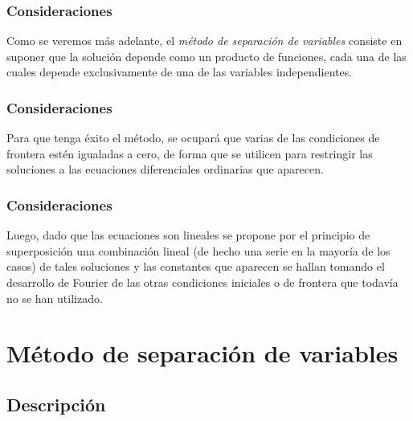 \documentclass[12pt]{beamer}
\begin{document}
\begin{frame}
\frametitle{Consideraciones}
Como se veremos más adelante, el \emph{método de separación de variables} consiste en suponer que la solución depende como un producto de funciones, cada una de las cuales depende exclusivamente de una de las variables independientes.
\end{frame}
\begin{frame}
\frametitle{Consideraciones}
Para que tenga éxito el método, se ocupará que varias de las condiciones de frontera estén igualadas a cero, de forma que se utilicen para restringir las soluciones a las ecuaciones diferenciales ordinarias que aparecen.
\end{frame}
\begin{frame}
\frametitle{Consideraciones}
Luego, dado que las ecuaciones son lineales se propone por el principio de superposición una combinación lineal (de hecho una serie en la mayoría de los casos) de tales soluciones y las constantes que aparecen se hallan tomando el desarrollo de Fourier de las otras condiciones iniciales o de frontera que todavía no se han utilizado.
\end{frame}

\section{Método de separación de variables}
\subsection{Descripción}
\end{document}
